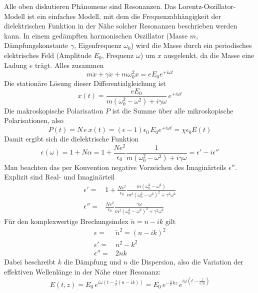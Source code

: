 Alle oben diskutieren Phänomene sind Resonanzen. Das Lorentz-Oszillator-Modell ist ein einfaches Modell, mit dem die Frequenzabhängigkeit der dielektrischen Funktion in der Nähe solcher Resonanzen beschrieben werden kann. In einem gedämpften harmonischen Oszillator (Masse $m$, Dämpfungskonstante $\gamma$, Eigenfrequenz $\omega_0$) wird die Masse durch ein periodisches elektrisches Feld (Amplitude $E_0$, Frequenz $\omega$) um $x$ ausgelenkt, da die Masse eine Ladung $e$ trägt. Alles zusammen
\begin{equation}
 m \ddot{x} + \gamma \dot{x} + m \omega_0^2  x = e E_0 e^{+ i \omega t}
\end{equation}
Die stationäre Lösung dieser Differentialgleichung ist
\begin{equation}
 x(t) = \frac{e E_0}{m (\omega_0^2  - \omega^2) + i \gamma \omega} \, e^{+ i \omega t}
\end{equation}
Die makroskopische Polarisation $P$ ist die Summe über alle mikroskopische Polarisationen, also
\begin{equation}
P(t) = N \, e \,x(t) =  (\epsilon -1 ) \epsilon_0 \, E_0 e^{+ i \omega t}
= \chi \epsilon_0 E(t)
\end{equation}
Damit ergibt sich die dielektrische Funktion
\begin{equation}
\epsilon(\omega) = 1 + N \alpha = 1 +\frac{N e^2}{\epsilon_0} \frac{1}{m (\omega_0^2  - \omega^2) + i \gamma \omega} = \epsilon' - i \epsilon''
\end{equation}
Man beachten das per Konvention negative Vorzeichen des Imaginärteils $\epsilon''$. Explizit sind Real- und Imaginärteil
\begin{align}
 \epsilon' = & 1 + \frac{N e^2}{\epsilon_0} \frac{ m (\omega_0^2  - \omega^2)}{m^2 (\omega_0^2  - \omega^2)^2 +  \gamma^2 \omega^2}  \\
  \epsilon'' = &  \frac{N e^2}{\epsilon_0} \frac{ \gamma \omega }{m^2 (\omega_0^2  - \omega^2)^2 +  \gamma^2 \omega^2} 
\end{align}
Für den  komplexwertige Brechungsindex $\tilde{n} = n - i k$ gilt
\begin{align}
 \epsilon = & \tilde{n}^2 = (n - i k)^2 \\
  \epsilon' =& n^2 - k^2 \\
 \epsilon'' = & 2 n k
\end{align}
Dabei beschreibt $k$ die Dämpfung und $n$ die Dispersion, also die Variation der effektiven Wellenlänge in der Nähe einer Resonanz:
\begin{equation}
E(t,z) = E_0 \, e^{i \omega (t - \frac{z}{c}(n - i k))} = 
 E_0 \, e^{ - \frac{\omega}{c} k z}  
 \, e^{i \omega (t - \frac{z}{c/n} )} 
\end{equation}

